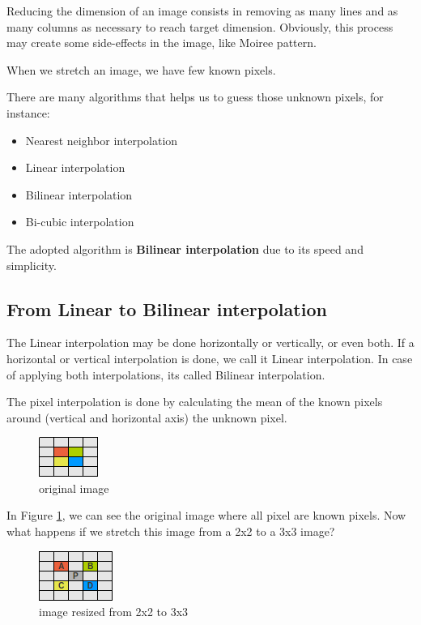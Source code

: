 \documentclass{article}
\begin{document}
	Reducing the dimension of an image consists in removing as many lines and as many columns as necessary to reach target dimension. Obviously, this
	process may create some side-effects in the image, like Moiree pattern.

	When we stretch an image, we have few known pixels.

	There are many algorithms that helps us to guess those unknown pixels, for instance:

	\begin{itemize}
	  \item Nearest neighbor interpolation
	  \item Linear interpolation
	  \item Bilinear interpolation
	  \item Bi-cubic interpolation
	\end{itemize}

	The adopted algorithm is \textbf{Bilinear interpolation}  due to its speed and simplicity.
	
\subsection{From Linear to Bilinear interpolation}

	The Linear interpolation may be done horizontally or vertically, or even both. If a horizontal or vertical interpolation is done, we call it
	Linear interpolation. In case of applying both interpolations, its called Bilinear interpolation.	

	The pixel interpolation is done by calculating the mean of the known pixels around (vertical and horizontal axis) the unknown pixel. 

	\begin{figure} [H]
		\centering
		\includegraphics[scale=1]{images/bilinear_interpolation_1}
		\caption{original image \label{bilinear1}}
	\end{figure}

	In Figure \ref{bilinear1}, we can see the original image where all pixel are known pixels. Now what happens if we stretch this image 
	from a 2x2 to a 3x3 image?
	
	\begin{figure} [H]
		\centering
		\includegraphics[scale=1]{images/bilinear_interpolation_2}
		\caption{image resized from 2x2 to 3x3 \label{bilinear2}}
	\end{figure}
\end{document}
